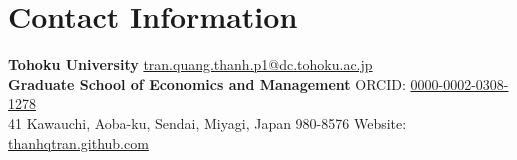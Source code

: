 \section{\sc Contact Information}
{\bf Tohoku University}     \hfill   \href{mailto:tran.quang.thanh.p1@dc.tohoku.ac.jp}{tran.quang.thanh.p1@dc.tohoku.ac.jp}\\
{\bf Graduate School of Economics and Management}  	 		\hfill ORCID: \href{https://orcid.org/0000-0002-0308-1278}{0000-0002-0308-1278}\\
41 Kawauchi, Aoba-ku, Sendai, Miyagi, Japan 980-8576 \hfill Website: \href{https://thanhqtran.github.com}{thanhqtran.github.com} \\
\\


